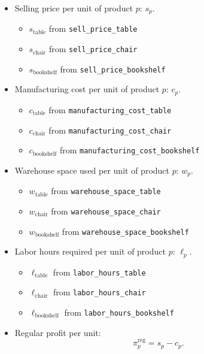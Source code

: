 \begin{itemize}
    \item Selling price per unit of product $p$: $s_p$.
    \begin{itemize}
        \item $s_{\text{table}}$ from \texttt{sell\_price\_table}
        \item $s_{\text{chair}}$ from \texttt{sell\_price\_chair}
        \item $s_{\text{bookshelf}}$ from \texttt{sell\_price\_bookshelf}
    \end{itemize}

    \item Manufacturing cost per unit of product $p$: $c_p$.
    \begin{itemize}
        \item $c_{\text{table}}$ from \texttt{manufacturing\_cost\_table}
        \item $c_{\text{chair}}$ from \texttt{manufacturing\_cost\_chair}
        \item $c_{\text{bookshelf}}$ from \texttt{manufacturing\_cost\_bookshelf}
    \end{itemize}

    \item Warehouse space used per unit of product $p$: $w_p$.
    \begin{itemize}
        \item $w_{\text{table}}$ from \texttt{warehouse\_space\_table}
        \item $w_{\text{chair}}$ from \texttt{warehouse\_space\_chair}
        \item $w_{\text{bookshelf}}$ from \texttt{warehouse\_space\_bookshelf}
    \end{itemize}

    \item Labor hours required per unit of product $p$: $\ell_p$.
    \begin{itemize}
        \item $\ell_{\text{table}}$ from \texttt{labor\_hours\_table}
        \item $\ell_{\text{chair}}$ from \texttt{labor\_hours\_chair}
        \item $\ell_{\text{bookshelf}}$ from \texttt{labor\_hours\_bookshelf}
    \end{itemize}

    \item Regular profit per unit:
    \[
    \pi_p^{\mathrm{reg}} = s_p - c_p.
    \]


\end{itemize}
